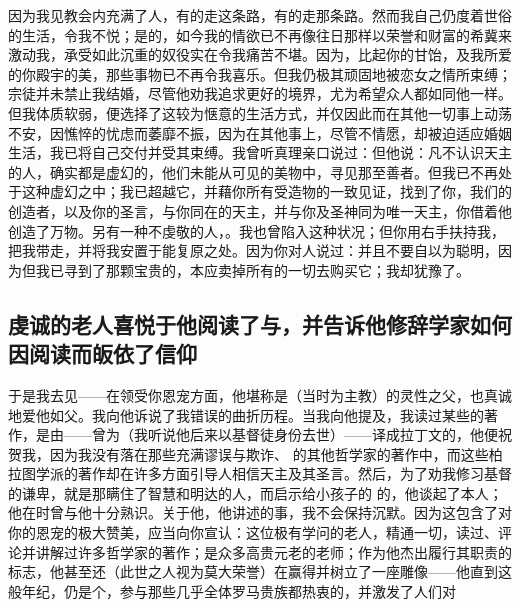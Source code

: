 因为我见教会内充满了人，有的走这条路，有的走那条路。然而我自己仍度着世俗的生活，令我不悦；是的，如今我的情欲已不再像往日那样以荣誉和财富的希冀来激动我，承受如此沉重的奴役实在令我痛苦不堪。因为，比起你的甘饴，及我所爱的你殿宇的美，那些事物已不再令我喜乐。但我仍极其顽固地被恋女之情所束缚；宗徒并未禁止我结婚，尽管他劝我追求更好的境界，尤为希望众人都如同他一样。但我体质软弱，便选择了这较为惬意的生活方式，并仅因此而在其他一切事上动荡不安，因憔悴的忧虑而萎靡不振，因为在其他事上，尽管不情愿，却被迫适应婚姻生活，我已将自己交付并受其束缚。我曾听真理亲口说过：但他说：凡不认识天主的人，确实都是虚幻的，他们未能从可见的美物中，寻见那至善者。但我已不再处于这种虚幻之中；我已超越它，并藉你所有受造物的一致见证，找到了你，我们的创造者，以及你的圣言，与你同在的天主，并与你及圣神同为唯一天主，你借着他创造了万物。另有一种不虔敬的人，。我也曾陷入这种状况；但你用右手扶持我，把我带走，并将我安置于能复原之处。因为你对人说过：并且不要自以为聪明，因为但我已寻到了那颗宝贵的，本应卖掉所有的一切去购买它；我却犹豫了。\par


\subsection{虔诚的老人喜悦于他阅读了与，并告诉他修辞学家如何因阅读而皈依了信仰}

于是我去见——在领受你恩宠方面，他堪称是（当时为主教）的灵性之父，也真诚地爱他如父。我向他诉说了我错误的曲折历程。当我向他提及，我读过某些的著作，是由——曾为（我听说他后来以基督徒身份去世）——译成拉丁文的，他便祝贺我，因为我没有落在那些充满谬误与欺诈、 的其他哲学家的著作中，而这些柏拉图学派的著作却在许多方面引导人相信天主及其圣言。然后，为了劝我修习基督的谦卑，就是那瞒住了智慧和明达的人，而启示给小孩子的 的，他谈起了本人；他在时曾与他十分熟识。关于他，他讲述的事，我不会保持沉默。因为这包含了对你的恩宠的极大赞美，应当向你宣认：这位极有学问的老人，精通一切，读过、评论并讲解过许多哲学家的著作；是众多高贵元老的老师；作为他杰出履行其职责的标志，他甚至还（此世之人视为莫大荣誉）在赢得并树立了一座雕像——他直到这般年纪，仍是个，参与那些几乎全体罗马贵族都热衷的，并激发了人们对\par

